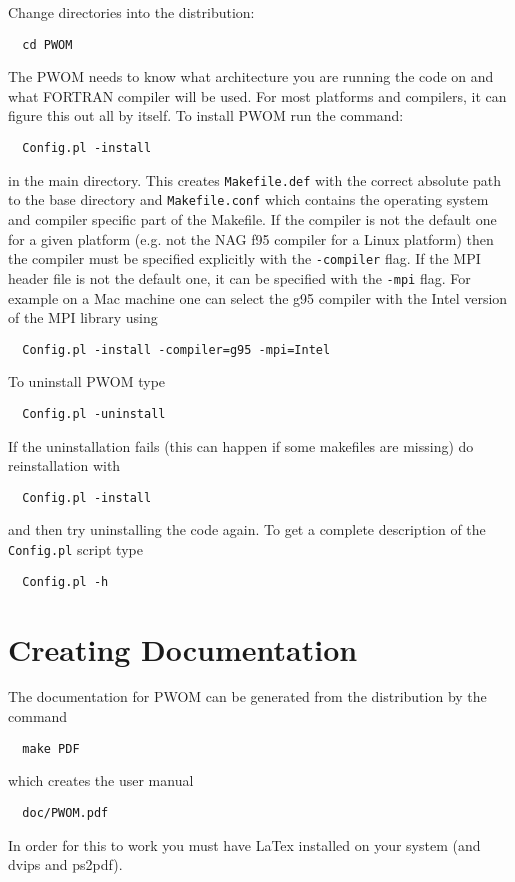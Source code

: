 Change directories into the distribution:
\begin{verbatim}
  cd PWOM
\end{verbatim}

The PWOM needs to know what architecture you are running the code on
and what FORTRAN compiler will be used.  For most platforms and compilers,
it can figure this out all by itself. To install PWOM run the command:
\begin{verbatim}
  Config.pl -install
\end{verbatim}
in the main directory. This creates {\tt Makefile.def} with
the correct absolute path to the base directory and {\tt Makefile.conf}
which contains the operating system and compiler specific part of
the Makefile. If the compiler is not the default one for a given
platform (e.g. not the NAG f95 compiler for a Linux platform) then
the compiler must be specified explicitly with the {\tt -compiler}
flag. If the MPI header file is not the default one, it can be
specified with the {\tt -mpi} flag. For example on a Mac machine
one can select the g95 compiler with the Intel version of the 
MPI library using
\begin{verbatim}
  Config.pl -install -compiler=g95 -mpi=Intel
\end{verbatim}
To uninstall PWOM type
\begin{verbatim}
  Config.pl -uninstall
\end{verbatim}
If the uninstallation fails (this can happen if some makefiles are missing)
do reinstallation with
\begin{verbatim}
  Config.pl -install
\end{verbatim}
and then try uninstalling the code again.
To get a complete description of the {\tt Config.pl}  script type
\begin{verbatim}
  Config.pl -h
\end{verbatim}

\section{Creating Documentation}

The documentation for PWOM can be generated from the distribution by
the command
\begin{verbatim}
  make PDF
\end{verbatim}
which creates the user manual
\begin{verbatim}
  doc/PWOM.pdf
\end{verbatim}
In order for this to work you must have
LaTex installed on your system (and dvips and ps2pdf).  


